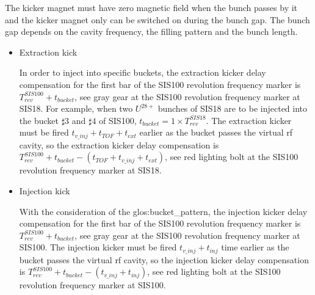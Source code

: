 
The kicker magnet must have zero magnetic field when the bunch passes by it and the kicker magnet only can be switched on during the bunch gap. The bunch gap depends on the cavity frequency, the filling pattern and the bunch length. 

\begin{itemize}
\item Extraction kick

In order to inject into specific buckets, the extraction kicker delay compensation for the first bar of the SIS100 revolution frequency marker is $T_{\mathit{rev}}^{\mathit{SIS100}} + t_{\mathit{bucket}}$, see gray gear at the SIS100 revolution frequency marker at SIS18. For example, when two $U^{28+}$ bunches of SIS18 are to be injected into the bucket $\sharp3$ and $\sharp4$ of SIS100, $t_{\mathit{bucket}} =1 \times T_{\mathit{rev}}^{\mathit{SIS18}}$. The extraction kicker must be fired $t_{\mathit{v\_inj}}+t_{\mathit{TOF}}+t_{\mathit{ext}}$ earlier as the bucket passes the virtual rf cavity, so the extraction kicker delay compensation is $T_{\mathit{rev}}^{\mathit{SIS100}} + t_{\mathit{bucket}} - (t_{\mathit{TOF}} + t_{\mathit{v\_inj}} + t_{\mathit{ext}})$, see red lighting bolt at the SIS100 revolution frequency marker at SIS18. 

\item Injection kick

With the consideration of the \gls{glos:bucket_pattern}, the injection kicker delay compensation for the first bar of the SIS100 revolution frequency marker is $T_{\mathit{rev}}^{\mathit{SIS100}} + t_{\mathit{bucket}}$, see gray gear at the SIS100 revolution frequency marker at SIS100. The injection kicker must be fired $t_{\mathit{v\_inj}}+t_{\mathit{inj}}$ time earlier as the bucket passes the virtual rf cavity, so the injection kicker delay compensation is $T_{\mathit{rev}}^{\mathit{SIS100}} + t_{\mathit{bucket}} - (t_{\mathit{v\_inj}} + t_{\mathit{inj}})$, see red lighting bolt at the SIS100 revolution frequency marker at SIS100.
\end{itemize}

